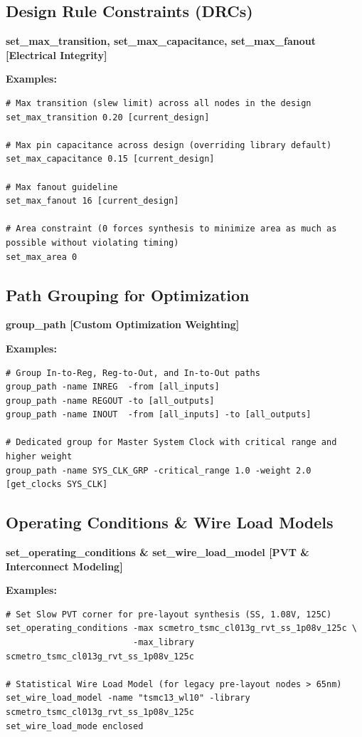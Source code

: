 \documentclass[11pt,a4paper]{article}
\newenvironment{cmdbox}[2]{%
  \begin{mdframed}[style=cmdstyle]%
  {\bfseries\sffamily\color{primary}#1 \hfill \footnotesize\color{mutedgray}[#2]}\par\vspace{3pt}%
}{%
  \end{mdframed}%
}
\begin{document}
\subsection{Design Rule Constraints (DRCs)}
\begin{cmdbox}{set\_max\_transition, set\_max\_capacitance, set\_max\_fanout}{Electrical Integrity}
\textbf{Examples:}
\begin{lstlisting}[style=sdcstyle]
# Max transition (slew limit) across all nodes in the design
set_max_transition 0.20 [current_design]

# Max pin capacitance across design (overriding library default)
set_max_capacitance 0.15 [current_design]

# Max fanout guideline
set_max_fanout 16 [current_design]

# Area constraint (0 forces synthesis to minimize area as much as possible without violating timing)
set_max_area 0
\end{lstlisting}
\end{cmdbox}

\subsection{Path Grouping for Optimization}
\begin{cmdbox}{group\_path}{Custom Optimization Weighting}
\textbf{Examples:}
\begin{lstlisting}[style=sdcstyle]
# Group In-to-Reg, Reg-to-Out, and In-to-Out paths
group_path -name INREG  -from [all_inputs]
group_path -name REGOUT -to [all_outputs]
group_path -name INOUT  -from [all_inputs] -to [all_outputs]

# Dedicated group for Master System Clock with critical range and higher weight
group_path -name SYS_CLK_GRP -critical_range 1.0 -weight 2.0 [get_clocks SYS_CLK]
\end{lstlisting}
\end{cmdbox}

\subsection{Operating Conditions \& Wire Load Models}
\begin{cmdbox}{set\_operating\_conditions \& set\_wire\_load\_model}{PVT \& Interconnect Modeling}
\textbf{Examples:}
\begin{lstlisting}[style=sdcstyle]
# Set Slow PVT corner for pre-layout synthesis (SS, 1.08V, 125C)
set_operating_conditions -max scmetro_tsmc_cl013g_rvt_ss_1p08v_125c \
                         -max_library scmetro_tsmc_cl013g_rvt_ss_1p08v_125c

# Statistical Wire Load Model (for legacy pre-layout nodes > 65nm)
set_wire_load_model -name "tsmc13_wl10" -library scmetro_tsmc_cl013g_rvt_ss_1p08v_125c
set_wire_load_mode enclosed
\end{lstlisting}
\end{cmdbox}
\end{document}
